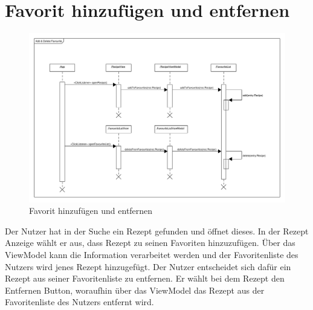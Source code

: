  \section{Favorit hinzufügen und entfernen}
\begin{figure}[H]
	\centering
	\includegraphics[width=\textwidth]{pics/dynamicDiagram/AddFav_DeleteFav_Recipe_SequenceD.pdf}%
	\caption{Favorit hinzufügen und entfernen}%
	\label{diagram}%
\end{figure}

Der Nutzer hat in der Suche ein Rezept gefunden und öffnet dieses. In der Rezept Anzeige wählt er aus, dass Rezept zu seinen Favoriten hinzuzufügen. Über das ViewModel kann die Information verarbeitet werden und der Favoritenliste des Nutzers wird jenes Rezept hinzugefügt. 
Der Nutzer entscheidet sich dafür ein Rezept aus seiner Favoritenliste zu entfernen. Er wählt bei dem Rezept den Entfernen Button, woraufhin über das ViewModel das Rezept aus der Favoritenliste des Nutzers entfernt wird.

  

  